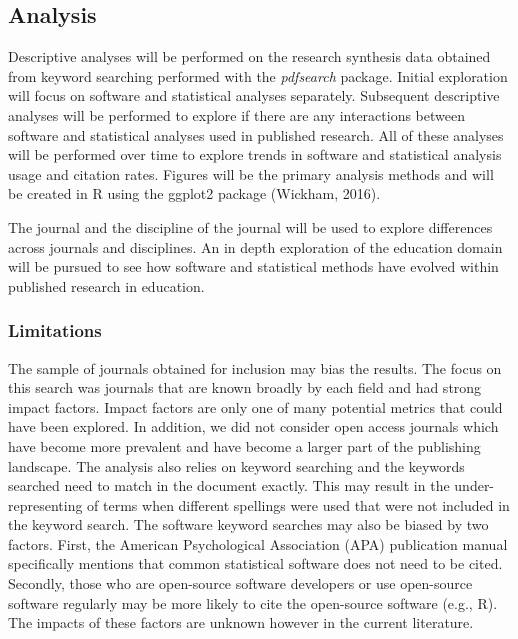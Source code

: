 \documentclass[
  english,
  ,man]{apa6}
\begin{document}
\hypertarget{analysis}{%
\subsection{Analysis}\label{analysis}}

Descriptive analyses will be performed on the research synthesis data obtained from keyword searching performed with the \emph{pdfsearch} package. Initial exploration will focus on software and statistical analyses separately. Subsequent descriptive analyses will be performed to explore if there are any interactions between software and statistical analyses used in published research. All of these analyses will be performed over time to explore trends in software and statistical analysis usage and citation rates. Figures will be the primary analysis methods and will be created in R using the ggplot2 package (Wickham, 2016).

The journal and the discipline of the journal will be used to explore differences across journals and disciplines. An in depth exploration of the education domain will be pursued to see how software and statistical methods have evolved within published research in education.

\hypertarget{limitations}{%
\subsubsection{Limitations}\label{limitations}}

The sample of journals obtained for inclusion may bias the results. The focus on this search was journals that are known broadly by each field and had strong impact factors. Impact factors are only one of many potential metrics that could have been explored. In addition, we did not consider open access journals which have become more prevalent and have become a larger part of the publishing landscape. The analysis also relies on keyword searching and the keywords searched need to match in the document exactly. This may result in the under-representing of terms when different spellings were used that were not included in the keyword search. The software keyword searches may also be biased by two factors. First, the American Psychological Association (APA) publication manual specifically mentions that common statistical software does not need to be cited. Secondly, those who are open-source software developers or use open-source software regularly may be more likely to cite the open-source software (e.g., R). The impacts of these factors are unknown however in the current literature.
\end{document}
